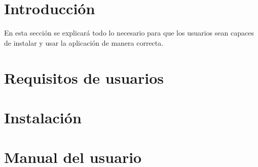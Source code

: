 
\section{Introducción}

En esta sección se explicará todo lo necesario para que los usuarios sean capaces de instalar y usar la aplicación de manera correcta.

\section{Requisitos de usuarios}

\section{Instalación}

\section{Manual del usuario}


